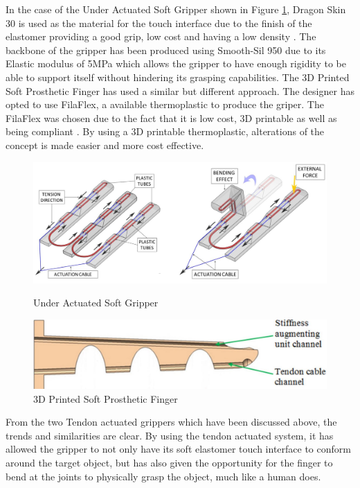 \documentclass[11pt]{article}
\begin{document}
In the case of the Under Actuated Soft Gripper shown in Figure \ref{fig:Tendon2}, Dragon Skin 30 is used as the material for the touch interface due to the finish of the elastomer providing a good grip, low cost and having a low density \cite{hassan2015design}. The backbone of the gripper has been produced using Smooth-Sil 950 due to its Elastic modulus of 5MPa which allows the gripper to have enough rigidity to be able to support itself without hindering its grasping capabilities. The 3D Printed Soft Prosthetic Finger has used a similar but different approach. The designer has opted to use FilaFlex, a  available thermoplastic to produce the griper. The FilaFlex was chosen due to the fact that it is low cost, 3D printable as well as being compliant \cite{mutlu2016mechanical}. By using a 3D printable thermoplastic, alterations of the  concept is made easier and more cost effective.
\begin{figure}[!h]
\centering
\begin{minipage}[b]{.6\textwidth}
\includegraphics[width=\linewidth]{Tendon}
\caption{Under Actuated Soft Gripper}
\label{fig:Tendon}
\end{minipage}
\hfill
\begin{minipage}[b]{0.35\textwidth}
\includegraphics[width=1.25\linewidth]{Tendon2}
\caption{3D Printed Soft Prosthetic Finger}
\label{fig:Tendon2}
\end{minipage}
\end{figure}
From the two Tendon actuated grippers which have been discussed above, the trends and similarities are clear. By using the tendon actuated system, it has allowed the gripper to not only have its soft elastomer touch interface to conform around the target object, but has also given the opportunity for the finger to bend at the joints to physically grasp the object, much like a human does.
\pagebreak
\end{document}
